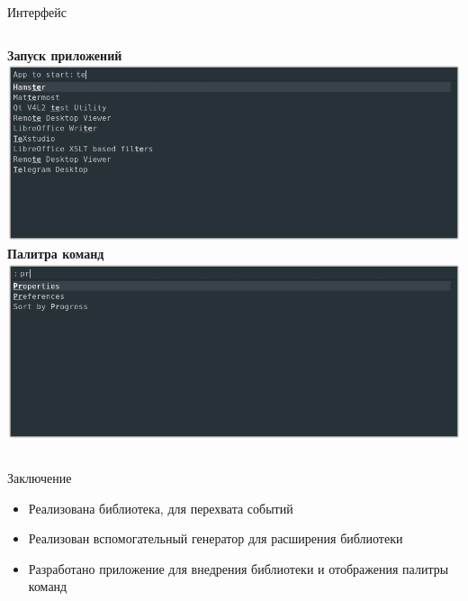 \documentclass[aspectratio=1610]{beamer}
\begin{document}
\begin{frame}{Интерфейс}
    \begin{columns}
		\textbf{Запуск приложений}
		\centering
		\includegraphics[width=\textwidth]{start_ui}
		\textbf{Палитра команд}
		\centering
		\includegraphics[width=\textwidth]{control_ui}
	\end{columns}
\end{frame}

\begin{frame}{Заключение}
	\begin{itemize}
		\item Реализована библиотека, для перехвата событий
		\item Реализован вспомогательный генератор для расширения библиотеки
		\item Разработано приложение для внедрения библиотеки и отображения палитры команд
	\end{itemize}
\end{frame}

\frame{\titlepage}
\end{document}
